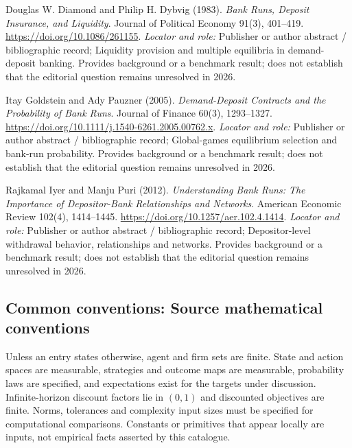 \documentclass[11pt,a4paper]{article}
\begin{document}
\begin{enumerate}[label={[S\arabic*]},leftmargin=*]

\item Douglas W. Diamond and Philip H. Dybvig (1983). \emph{Bank Runs, Deposit Insurance, and Liquidity}. Journal of Political Economy 91(3), 401–419. \url{https://doi.org/10.1086/261155}.
\textit{Locator and role:} Publisher or author abstract / bibliographic record; Liquidity provision and multiple equilibria in demand-deposit banking. Provides background or a benchmark result; does not establish that the editorial question remains unresolved in 2026.

\item Itay Goldstein and Ady Pauzner (2005). \emph{Demand-Deposit Contracts and the Probability of Bank Runs}. Journal of Finance 60(3), 1293–1327. \url{https://doi.org/10.1111/j.1540-6261.2005.00762.x}.
\textit{Locator and role:} Publisher or author abstract / bibliographic record; Global-games equilibrium selection and bank-run probability. Provides background or a benchmark result; does not establish that the editorial question remains unresolved in 2026.

\item Rajkamal Iyer and Manju Puri (2012). \emph{Understanding Bank Runs: The Importance of Depositor-Bank Relationships and Networks}. American Economic Review 102(4), 1414–1445. \url{https://doi.org/10.1257/aer.102.4.1414}.
\textit{Locator and role:} Publisher or author abstract / bibliographic record; Depositor-level withdrawal behavior, relationships and networks. Provides background or a benchmark result; does not establish that the editorial question remains unresolved in 2026.

\end{enumerate}

\subsection*{Common conventions: Source mathematical conventions}

Unless an entry states otherwise, agent and firm sets are finite. State and action spaces are measurable, strategies and outcome maps are measurable, probability laws are specified, and expectations exist for the targets under discussion. Infinite-horizon discount factors lie in $(0,1)$ and discounted objectives are finite. Norms, tolerances and complexity input sizes must be specified for computational comparisons. Constants or primitives that appear locally are inputs, not empirical facts asserted by this catalogue.
\end{document}

